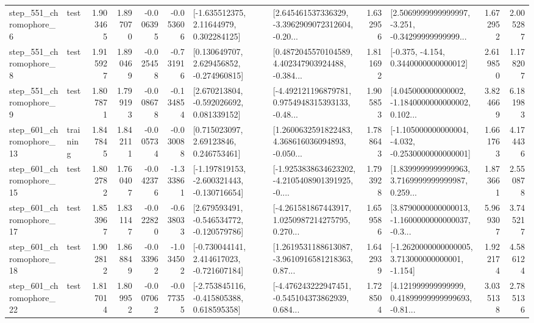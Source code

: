 \begin{tabular}{llrrrrllrlrr}
   step\_551\_chromophore\_6 &      test &      1.903465 &    1.897070 &     -0.006395 & -0.053606 &     [-1.635512375, 2.11644979, 0.302284125] &  [2.645461537336329, -3.3962909072312604, -0.20... &       1.632956 &  [2.5069999999999997, -3.251, -0.34299999999999... &            1.672952 &          2.005287 \\
   step\_551\_chromophore\_8 &      test &      1.915927 &    1.890469 &     -0.025458 & -0.731916 &    [0.130649707, 2.629456852, -0.274960815] &  [0.4872045570104589, 4.402347903924488, -0.384... &       1.811692 &               [-0.375, -4.154, 0.3440000000000012] &            2.619850 &          1.178207 \\
   step\_551\_chromophore\_9 &      test &      1.807871 &    1.799193 &     -0.008678 & -0.134854 &    [2.670213804, -0.592026692, 0.081339152] &  [-4.492121196879781, 0.9754948315393133, -0.48... &       1.905853 &  [4.045000000000002, -1.1840000000000002, 0.102... &            3.824669 &          6.181983 \\
  step\_601\_chromophore\_13 &  training &      1.847845 &    1.842111 &     -0.005734 & -0.030088 &      [0.715023097, 2.69123846, 0.246753461] &  [1.2600632591822483, 4.368616036094893, -0.050... &       1.788643 &  [-1.105000000000004, -4.032, -0.2530000000000001] &            1.661763 &          4.174436 \\
  step\_601\_chromophore\_15 &      test &      1.802782 &    1.760407 &     -0.042376 & -1.333861 &  [-1.197819153, -2.600321443, -0.130716654] &  [-1.9253838634623202, -4.2105408901391925, -0.... &       1.793928 &  [1.8399999999999963, 3.7169999999999987, 0.259... &            1.873661 &          2.550878 \\
  step\_601\_chromophore\_17 &      test &      1.853967 &    1.831147 &     -0.022820 & -0.638033 &   [2.679593491, -0.546534772, -0.120579786] &  [-4.261581867443917, 1.0250987214275795, 0.270... &       1.659586 &  [3.8790000000000013, -1.1600000000000037, -0.3... &            5.969307 &          3.745217 \\
  step\_601\_chromophore\_18 &      test &      1.902812 &    1.868849 &     -0.033962 & -1.034502 &   [-0.730044141, 2.414617023, -0.721607184] &  [1.2619531188613087, -3.9610916581218363, 0.87... &       1.642939 &   [-1.2620000000000005, 3.713000000000001, -1.154] &            1.922174 &          4.586124 \\
  step\_601\_chromophore\_22 &      test &      1.817014 &    1.809952 &     -0.007062 & -0.077355 &   [-2.753845116, -0.415805388, 0.618595358] &  [-4.476243222947451, -0.545104373862939, 0.684... &       1.728504 &  [4.121999999999999, 0.41899999999999693, -0.81... &            3.035138 &          2.785136 \\

\end{tabular}
